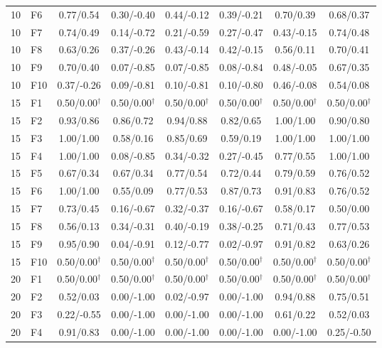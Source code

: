 \documentclass[10pt,a4paper]{article}
\begin{document}
\begin{table}[p]
\begin{tabular}{clcccccc}
10 & F6 & 0.77/0.54 & 0.30/-0.40 & 0.44/-0.12 & 0.39/-0.21 & 0.70/0.39 & 0.68/0.37 \\
10 & F7 & 0.74/0.49 & 0.14/-0.72 & 0.21/-0.59 & 0.27/-0.47 & 0.43/-0.15 & 0.74/0.48 \\
10 & F8 & 0.63/0.26 & 0.37/-0.26 & 0.43/-0.14 & 0.42/-0.15 & 0.56/0.11 & 0.70/0.41 \\
10 & F9 & 0.70/0.40 & 0.07/-0.85 & 0.07/-0.85 & 0.08/-0.84 & 0.48/-0.05 & 0.67/0.35 \\
10 & F10 & 0.37/-0.26 & 0.09/-0.81 & 0.10/-0.81 & 0.10/-0.80 & 0.46/-0.08 & 0.54/0.08 \\
\midrule
15 & F1 & 0.50/0.00$^{\dagger}$ & 0.50/0.00$^{\dagger}$ & 0.50/0.00$^{\dagger}$ & 0.50/0.00$^{\dagger}$ & 0.50/0.00$^{\dagger}$ & 0.50/0.00$^{\dagger}$ \\
15 & F2 & 0.93/0.86 & 0.86/0.72 & 0.94/0.88 & 0.82/0.65 & 1.00/1.00 & 0.90/0.80 \\
15 & F3 & 1.00/1.00 & 0.58/0.16 & 0.85/0.69 & 0.59/0.19 & 1.00/1.00 & 1.00/1.00 \\
15 & F4 & 1.00/1.00 & 0.08/-0.85 & 0.34/-0.32 & 0.27/-0.45 & 0.77/0.55 & 1.00/1.00 \\
15 & F5 & 0.67/0.34 & 0.67/0.34 & 0.77/0.54 & 0.72/0.44 & 0.79/0.59 & 0.76/0.52 \\
15 & F6 & 1.00/1.00 & 0.55/0.09 & 0.77/0.53 & 0.87/0.73 & 0.91/0.83 & 0.76/0.52 \\
15 & F7 & 0.73/0.45 & 0.16/-0.67 & 0.32/-0.37 & 0.16/-0.67 & 0.58/0.17 & 0.50/0.00 \\
15 & F8 & 0.56/0.13 & 0.34/-0.31 & 0.40/-0.19 & 0.38/-0.25 & 0.71/0.43 & 0.77/0.53 \\
15 & F9 & 0.95/0.90 & 0.04/-0.91 & 0.12/-0.77 & 0.02/-0.97 & 0.91/0.82 & 0.63/0.26 \\
15 & F10 & 0.50/0.00$^{\dagger}$ & 0.50/0.00$^{\dagger}$ & 0.50/0.00$^{\dagger}$ & 0.50/0.00$^{\dagger}$ & 0.50/0.00$^{\dagger}$ & 0.50/0.00$^{\dagger}$ \\
\midrule
20 & F1 & 0.50/0.00$^{\dagger}$ & 0.50/0.00$^{\dagger}$ & 0.50/0.00$^{\dagger}$ & 0.50/0.00$^{\dagger}$ & 0.50/0.00$^{\dagger}$ & 0.50/0.00$^{\dagger}$ \\
20 & F2 & 0.52/0.03 & 0.00/-1.00 & 0.02/-0.97 & 0.00/-1.00 & 0.94/0.88 & 0.75/0.51 \\
20 & F3 & 0.22/-0.55 & 0.00/-1.00 & 0.00/-1.00 & 0.00/-1.00 & 0.61/0.22 & 0.52/0.03 \\
20 & F4 & 0.91/0.83 & 0.00/-1.00 & 0.00/-1.00 & 0.00/-1.00 & 0.00/-1.00 & 0.25/-0.50 \\

\end{tabular}
\end{table}
\end{document}
